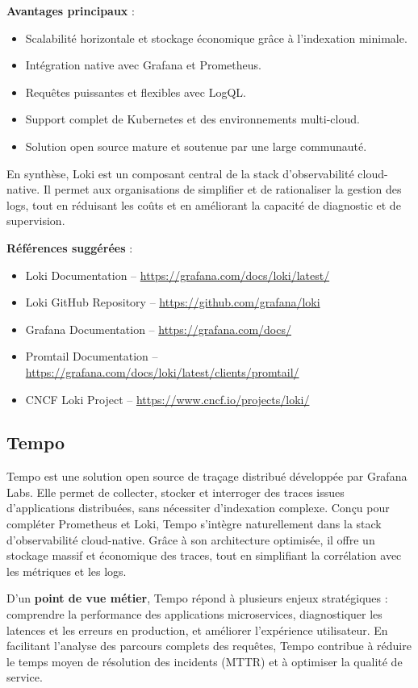 \textbf{Avantages principaux} :
\begin{itemize}
	\item Scalabilité horizontale et stockage économique grâce à l’indexation minimale.
	\item Intégration native avec Grafana et Prometheus.
	\item Requêtes puissantes et flexibles avec LogQL.
	\item Support complet de Kubernetes et des environnements multi-cloud.
	\item Solution open source mature et soutenue par une large communauté.
\end{itemize}

En synthèse, Loki est un composant central de la stack d’observabilité cloud-native. Il permet aux organisations de simplifier et de rationaliser la gestion des logs, tout en réduisant les coûts et en améliorant la capacité de diagnostic et de supervision.

\textbf{Références suggérées} :
\begin{itemize}
	\item Loki Documentation – \url{https://grafana.com/docs/loki/latest/}
	\item Loki GitHub Repository – \url{https://github.com/grafana/loki}
	\item Grafana Documentation – \url{https://grafana.com/docs/}
	\item Promtail Documentation – \url{https://grafana.com/docs/loki/latest/clients/promtail/}
	\item CNCF Loki Project – \url{https://www.cncf.io/projects/loki/}
\end{itemize}


\subsection{Tempo}

Tempo est une solution open source de traçage distribué développée par Grafana Labs. Elle permet de collecter, stocker et interroger des traces issues d’applications distribuées, sans nécessiter d’indexation complexe. Conçu pour compléter Prometheus et Loki, Tempo s’intègre naturellement dans la stack d’observabilité cloud-native. Grâce à son architecture optimisée, il offre un stockage massif et économique des traces, tout en simplifiant la corrélation avec les métriques et les logs.

D’un \textbf{point de vue métier}, Tempo répond à plusieurs enjeux stratégiques  : comprendre la performance des applications microservices, diagnostiquer les latences et les erreurs en production, et améliorer l’expérience utilisateur. En facilitant l’analyse des parcours complets des requêtes, Tempo contribue à réduire le temps moyen de résolution des incidents (MTTR) et à optimiser la qualité de service.

